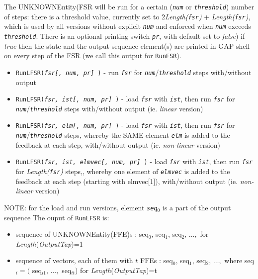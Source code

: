 \documentclass[a4paper,11pt]{report}
\begin{document}
{{{ The UNKNOWNEntity(FSR will be run for a certain (\mbox{\texttt{\mdseries\slshape num}} or \mbox{\texttt{\mdseries\slshape threshold}}) number of steps: there is a threshold value, currently set to
2\texttt{}\emph{Length(\mbox{\texttt{\mdseries\slshape fsr}})} + \emph{Length(\mbox{\texttt{\mdseries\slshape fsr}})}, which is used by all versions without explicit \mbox{\texttt{\mdseries\slshape num}} and enforced when \mbox{\texttt{\mdseries\slshape num}} exceeds \mbox{\texttt{\mdseries\slshape threshold}}. There is an optional printing switch \mbox{\texttt{\mdseries\slshape pr}}, with default set to \emph{false}) if \emph{true} then the state and the output sequence element(s) are printed in \textsf{GAP} shell on every step of the \textsf{FSR} (we call this output for \texttt{RunFSR}). 
\begin{itemize}
\item  \texttt{RunLFSR(\mbox{\texttt{\mdseries\slshape  fsr[, num, pr] }})} - run \mbox{\texttt{\mdseries\slshape fsr}} for \mbox{\texttt{\mdseries\slshape num}}/\mbox{\texttt{\mdseries\slshape threshold}} steps with/without output
\item  \texttt{RunLFSR(\mbox{\texttt{\mdseries\slshape  fsr, ist[, num, pr] }})} - load \mbox{\texttt{\mdseries\slshape fsr}} with \mbox{\texttt{\mdseries\slshape ist}}, then run \mbox{\texttt{\mdseries\slshape fsr}} for \mbox{\texttt{\mdseries\slshape num}}/\mbox{\texttt{\mdseries\slshape threshold}} steps with/without output (ie. \emph{linear} version)
\item  \texttt{RunLFSR(\mbox{\texttt{\mdseries\slshape  fsr, elm[, num, pr] }})} - load \mbox{\texttt{\mdseries\slshape fsr}} with \mbox{\texttt{\mdseries\slshape ist}}, then run \mbox{\texttt{\mdseries\slshape fsr}} for \mbox{\texttt{\mdseries\slshape num}}/\mbox{\texttt{\mdseries\slshape threshold}} steps, whereby the SAME element \mbox{\texttt{\mdseries\slshape elm}} is added to the feedback at each step, with/without output (ie. \emph{non-linear} version)
\item  \texttt{RunLFSR(\mbox{\texttt{\mdseries\slshape  fsr, ist, elmvec[, num, pr] }})} - load \mbox{\texttt{\mdseries\slshape fsr}} with \mbox{\texttt{\mdseries\slshape ist}}, then run \mbox{\texttt{\mdseries\slshape fsr}} for \emph{Length(\mbox{\texttt{\mdseries\slshape fsr}})} steps,, whereby one element of \mbox{\texttt{\mdseries\slshape elmvec}} is added to the feedback at each step (starting with elmvec[1]), with/without
output (ie. \emph{non-linear} version)
\end{itemize}
 NOTE: for the load and run versions, element \mbox{\texttt{\mdseries\slshape seq}}$_0$ is a part of the output sequence The ouput of \texttt{RunLFSR} is: 
\begin{itemize}
\item  sequence of UNKNOWNEntity(FFE)s : seq$_0$, seq$_1$, seq$_2$, $\dots ,$ for \emph{Length}(\emph{OutputTap})=1
\item  sequence of vectors, each of them with $t$ FFEs : seq$_0$, seq$_1$, seq$_2$, $\dots ,$ where seq$_i=($ seq$_{i1}$, $\dots ,$ seq$_{it}$) for \emph{Length}(\emph{OutputTap})=t
\end{itemize}
 }

}}
\end{document}
